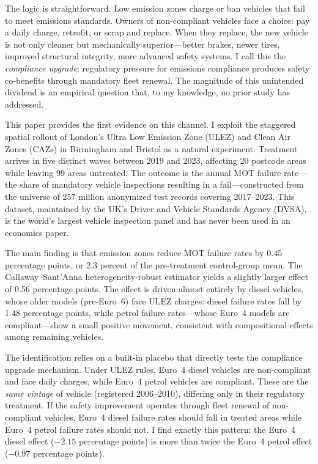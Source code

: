\documentclass[12pt]{article}
\begin{document}
The logic is straightforward. Low emission zones charge or ban vehicles that fail to meet emissions standards. Owners of non-compliant vehicles face a choice: pay a daily charge, retrofit, or scrap and replace. When they replace, the new vehicle is not only cleaner but mechanically superior---better brakes, newer tires, improved structural integrity, more advanced safety systems. I call this the \textit{compliance upgrade}: regulatory pressure for emissions compliance produces safety co-benefits through mandatory fleet renewal. The magnitude of this unintended dividend is an empirical question that, to my knowledge, no prior study has addressed.

This paper provides the first evidence on this channel. I exploit the staggered spatial rollout of London's Ultra Low Emission Zone (ULEZ) and Clean Air Zones (CAZs) in Birmingham and Bristol as a natural experiment. Treatment arrives in five distinct waves between 2019 and 2023, affecting 20 postcode areas while leaving 99 areas untreated. The outcome is the annual MOT failure rate---the share of mandatory vehicle inspections resulting in a fail---constructed from the universe of 257 million anonymized test records covering 2017--2023. This dataset, maintained by the UK's Driver and Vehicle Standards Agency (DVSA), is the world's largest vehicle inspection panel and has never been used in an economics paper.

The main finding is that emission zones reduce MOT failure rates by 0.45 percentage points, or 2.3 percent of the pre-treatment control-group mean. The Callaway--Sant'Anna heterogeneity-robust estimator yields a slightly larger effect of 0.56 percentage points. The effect is driven almost entirely by diesel vehicles, whose older models (pre-Euro~6) face ULEZ charges: diesel failure rates fall by 1.48 percentage points, while petrol failure rates---whose Euro~4 models are compliant---show a small positive movement, consistent with compositional effects among remaining vehicles.

The identification relies on a built-in placebo that directly tests the compliance upgrade mechanism. Under ULEZ rules, Euro~4 diesel vehicles are non-compliant and face daily charges, while Euro~4 petrol vehicles are compliant. These are the \textit{same vintage} of vehicle (registered 2006--2010), differing only in their regulatory treatment. If the safety improvement operates through fleet renewal of non-compliant vehicles, Euro~4 diesel failure rates should fall in treated areas while Euro~4 petrol failure rates should not. I find exactly this pattern: the Euro~4 diesel effect ($-2.15$ percentage points) is more than twice the Euro~4 petrol effect ($-0.97$ percentage points).
\end{document}
